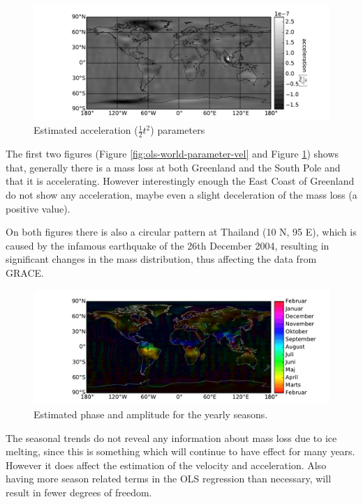 \begin{figure}[H]
	\centering
	\includegraphics[width=\textwidth]{figures/ols-world-parameter-acc}
	\caption{Estimated acceleration ($\frac{1}{2} t^2$) parameters}
	\label{fig:ols-world-parameter-acc}
\end{figure}

The first two figures (Figure \ref{fig:ols-world-parameter-vel} and Figure \ref{fig:ols-world-parameter-acc}) shows that, generally there is a mass loss at both Greenland and the South Pole and that it is accelerating. However interestingly enough the East Coast of Greenland do not show any acceleration, maybe even a slight deceleration of the mass loss (a positive value).

On both figures there is also a circular pattern at Thailand (10 N, 95 E), which is caused by the infamous earthquake of the 26th December 2004, resulting in significant changes in the mass distribution, thus affecting the data from GRACE.
\begin{figure}[H]
	\centering
	\includegraphics[width=\textwidth]{figures/ols-world-parameter-year}
	\caption{Estimated phase and amplitude for the yearly seasons.}
	\label{fig:ols-world-parameter-year}
\end{figure}

The seasonal trends do not reveal any information about mass loss due to ice melting, since this is something which will continue to have effect for many years. However it does affect the estimation of the velocity and acceleration. Also having more season related terms in the OLS regression than necessary, will result in fewer degrees of freedom.

